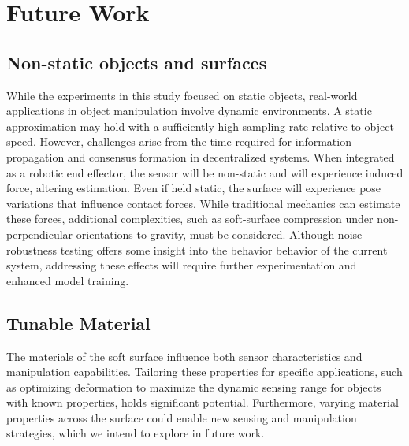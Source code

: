 \section{Future Work}

\subsection{Non-static objects and surfaces}
While the experiments in this study focused on static objects, real-world applications in object manipulation involve dynamic environments. A static approximation may hold with a sufficiently high sampling rate relative to object speed.
However, challenges arise from the time required for information propagation and consensus formation in decentralized systems.
When integrated as a robotic end effector, the sensor will be non-static and will experience induced force, altering estimation. Even if held static, the surface will experience pose variations that influence contact forces. While traditional mechanics can estimate these forces, additional complexities, such as soft-surface compression under non-perpendicular orientations to gravity, must be considered. Although noise robustness testing offers some insight into the behavior behavior of the current system, addressing these effects will require further experimentation and enhanced model training.



\subsection{Tunable Material}
The materials of the soft surface influence both sensor characteristics and manipulation capabilities. Tailoring these properties for specific applications, such as optimizing deformation to maximize the dynamic sensing range for objects with known properties, holds significant potential. Furthermore, varying material properties across the surface could enable new sensing and manipulation strategies, which we intend to explore in future work.




